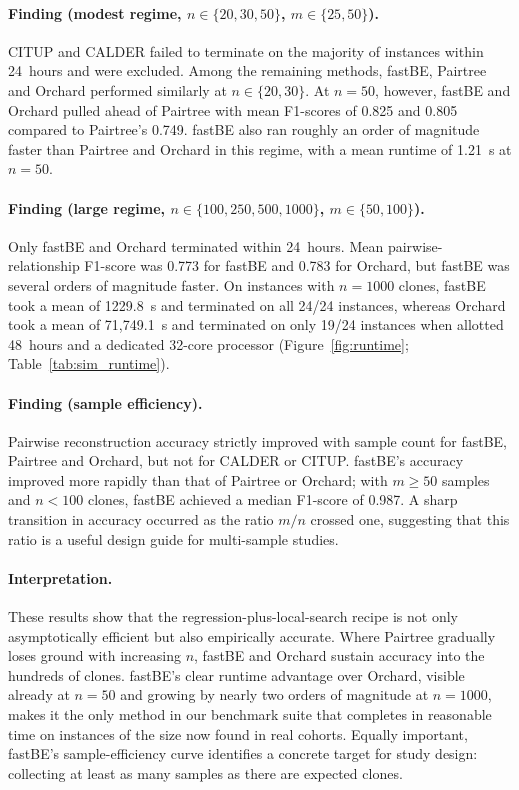 \documentclass[11pt]{article}
\begin{document}
\paragraph{Finding (modest regime, $n\in\{20,30,50\}$, $m\in\{25,50\}$).}
CITUP and CALDER failed to terminate on the majority of instances within 24~hours and were excluded. Among the remaining methods, fastBE, Pairtree and Orchard performed similarly at $n\in\{20,30\}$. At $n=50$, however, fastBE and Orchard pulled ahead of Pairtree with mean F1-scores of 0.825 and 0.805 compared to Pairtree's 0.749. fastBE also ran roughly an order of magnitude faster than Pairtree and Orchard in this regime, with a mean runtime of 1.21~s at $n=50$.

\paragraph{Finding (large regime, $n\in\{100,250,500,1000\}$, $m\in\{50,100\}$).}
Only fastBE and Orchard terminated within 24~hours. Mean pairwise-relationship F1-score was 0.773 for fastBE and 0.783 for Orchard, but fastBE was several orders of magnitude faster. On instances with $n=1000$ clones, fastBE took a mean of 1229.8~s and terminated on all 24/24 instances, whereas Orchard took a mean of 71{,}749.1~s and terminated on only 19/24 instances when allotted 48~hours and a dedicated 32-core processor (Figure~\ref{fig:runtime}; Table~\ref{tab:sim_runtime}).

\paragraph{Finding (sample efficiency).}
Pairwise reconstruction accuracy strictly improved with sample count for fastBE, Pairtree and Orchard, but not for CALDER or CITUP. fastBE's accuracy improved more rapidly than that of Pairtree or Orchard; with $m\geq 50$ samples and $n<100$ clones, fastBE achieved a median F1-score of 0.987. A sharp transition in accuracy occurred as the ratio $m/n$ crossed one, suggesting that this ratio is a useful design guide for multi-sample studies.

\paragraph{Interpretation.}
These results show that the regression-plus-local-search recipe is not only asymptotically efficient but also empirically accurate. Where Pairtree gradually loses ground with increasing $n$, fastBE and Orchard sustain accuracy into the hundreds of clones. fastBE's clear runtime advantage over Orchard, visible already at $n=50$ and growing by nearly two orders of magnitude at $n=1000$, makes it the only method in our benchmark suite that completes in reasonable time on instances of the size now found in real cohorts. Equally important, fastBE's sample-efficiency curve identifies a concrete target for study design: collecting at least as many samples as there are expected clones.
\end{document}
